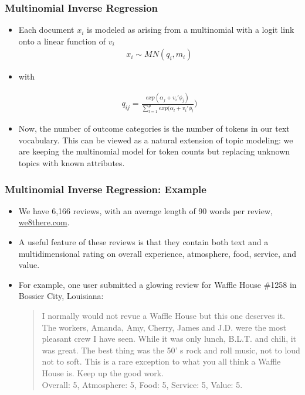 \documentclass[
  shownotes,
  xcolor={svgnames},
  hyperref={colorlinks,citecolor=DarkBlue,linkcolor=DarkRed,urlcolor=DarkBlue}
  , aspectratio=169]{beamer}
\begin{document}
\begin{frame}
\frametitle{Multinomial Inverse Regression}

\begin{itemize}
\item Each document $x_i$ is modeled as arising from a multinomial with a logit link onto a linear function of $v_i$
\medskip
\begin{align}
x_i \sim MN(q_i,m_i)
\end{align}

\item with


\begin{align}
q_{ij}=\frac{exp(\alpha_j + v_i'\phi_j)}{\sum_{l=1}^p exp(\alpha_l + v_i'\phi_l})
\end{align}
\medskip

\item Now, the number of outcome categories is the number of tokens in our text vocabulary. This can be viewed as a natural extension of topic modeling: we are keeping the multinomial model for token counts but replacing unknown topics with known attributes.
\end{itemize}



\end{frame}


\begin{frame}
\frametitle{Multinomial Inverse Regression: Example}

\begin{itemize}


\item We have 6,166 reviews, with an average length of 90 words per review, \url{we8there.com}. 
\medskip
\item A useful feature of these reviews is that they contain both text and a multidimensional rating on overall experience, atmosphere, food, service, and value. 
\medskip
\item For example, one user submitted a glowing review for Waffle House \#1258 in Bossier City, Louisiana: 
\medskip

\begin{quote}
I normally would not revue a Waffle House but this one deserves it. The workers, Amanda, Amy, Cherry, James and J.D. were the most pleasant crew I have seen. While it was only lunch, B.L.T. and chili, it was great. The best thing was the 50’ s rock and roll music, not to loud not to soft. This is a rare exception to what you all think a Waffle House is. Keep up the good work. \\
Overall: 5, Atmosphere: 5, Food: 5, Service: 5, Value: 5.  
 \end{quote} 


\end{itemize}





\end{frame}
\end{document}
